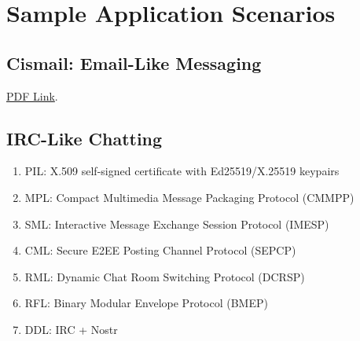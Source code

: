 \documentclass[a4paper,11pt]{article}
\begin{document}
\section{Sample Application Scenarios}

\subsection{Cismail: Email-Like Messaging}

\href{https://pub-714f8d634e8f451d9f2fe91a4debfa23.r2.dev/keep/ntexdb/note-20230210-cismail.pdf--9f1bb76e5b1938be3c8907311238dbc0.pdf}{PDF Link}.

\subsection{IRC-Like Chatting}

\begin{enumerate}
	\item PIL: X.509 self-signed certificate with Ed25519/X.25519 keypairs
	\item MPL: Compact Multimedia Message Packaging Protocol (CMMPP)
	\item SML: Interactive Message Exchange Session Protocol (IMESP)
	\item CML: Secure E2EE Posting Channel Protocol (SEPCP)
	\item RML: Dynamic Chat Room Switching Protocol (DCRSP)
	\item RFL: Binary Modular Envelope Protocol (BMEP)
	\item DDL: IRC + Nostr
\end{enumerate}
\end{document}

